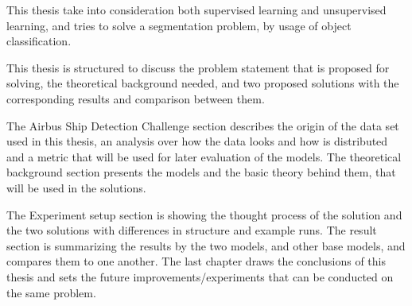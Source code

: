 This thesis take into consideration both supervised learning and unsupervised learning, and tries to solve a segmentation problem, by usage of object classification.

This thesis is structured to discuss the problem statement that is proposed for solving, the theoretical background needed, and two proposed solutions with the corresponding results and comparison between them.

The Airbus Ship Detection Challenge section describes the origin of the data set used in this thesis, an analysis over how the data looks and how is distributed and a metric that will be used for later evaluation of the models. The theoretical background section presents the models and the basic theory behind them, that will be used in the solutions.

The Experiment setup section is showing the thought process of the solution and the two solutions with differences in structure and example runs. The result section is summarizing the results by the two models, and other base models, and compares them to one another. The last chapter draws the conclusions of this thesis and sets the future improvements/experiments that can be conducted on the same problem.
